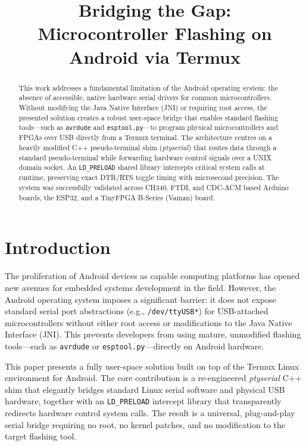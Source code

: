 \documentclass[conference]{IEEEtran}
\title{Bridging the Gap: \\Microcontroller Flashing on Android via Termux}
\author{
    \IEEEauthorblockN{Jnanesh Sathisha Karmar, Vivek K Kumar, \\
    Dr. G.V.V. Sharma}
    \IEEEauthorblockA{Department of Electrical Engineering, \\Indian Institute of Technology Hyderabad,\\ Kandi, India 502284 \\ gadepall@ee.iith.ac.in}
}
\begin{document}
\maketitle

\begin{abstract}
This work addresses a fundamental limitation of the Android operating system: the absence of accessible, native hardware serial drivers for common microcontrollers. Without modifying the Java Native Interface (JNI) or requiring root access, the presented solution creates a robust user-space bridge that enables standard flashing tools—such as \texttt{avrdude} and \texttt{esptool.py}—to program physical microcontrollers and FPGAs over USB directly from a Termux terminal. The architecture centres on a heavily modified C++ pseudo-terminal shim (\textit{ptyserial}) that routes data through a standard pseudo-terminal while forwarding hardware control signals over a UNIX domain socket. An \texttt{LD\_PRELOAD} shared library intercepts critical system calls at runtime, preserving exact DTR/RTS toggle timing with microsecond precision. The system was successfully validated across CH340, FTDI, and CDC-ACM based Arduino boards, the ESP32, and a TinyFPGA B-Series (Vaman) board.
\end{abstract}

\section{Introduction}

The proliferation of Android devices as capable computing platforms has opened new avenues for embedded systems development in the field. However, the Android operating system imposes a significant barrier: it does not expose standard serial port abstractions (e.g., \texttt{/dev/ttyUSB*}) for USB-attached microcontrollers without either root access or modifications to the Java Native Interface (JNI). This prevents developers from using mature, unmodified flashing tools—such as \texttt{avrdude} or \texttt{esptool.py}—directly on Android hardware.

This paper presents a fully user-space solution built on top of the Termux Linux environment for Android. The core contribution is a re-engineered \textit{ptyserial} C++ shim that elegantly bridges standard Linux serial software and physical USB hardware, together with an \texttt{LD\_PRELOAD} intercept library that transparently redirects hardware control system calls. The result is a universal, plug-and-play serial bridge requiring no root, no kernel patches, and no modification to the target flashing tool.
\end{document}
